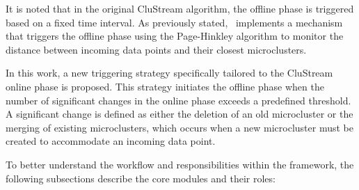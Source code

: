 It is noted that in the original CluStream algorithm, the offline phase is
triggered based on a fixed time interval. As previously
stated,~\cite{namitha_dynamic_clustering_2} implements a mechanism that
triggers the offline phase using the Page-Hinkley algorithm to monitor the
distance between incoming data points and their closest microclusters.

In this work, a new triggering strategy specifically tailored to the CluStream
online phase is proposed. This strategy initiates the offline phase when the
number of significant changes in the online phase exceeds a predefined
threshold. A significant change is defined as either the deletion of an old
microcluster or the merging of existing microclusters, which occurs when a new
microcluster must be created to accommodate an incoming data point.

To better understand the workflow and responsibilities within the framework,
the following subsections describe the core modules and their roles:

